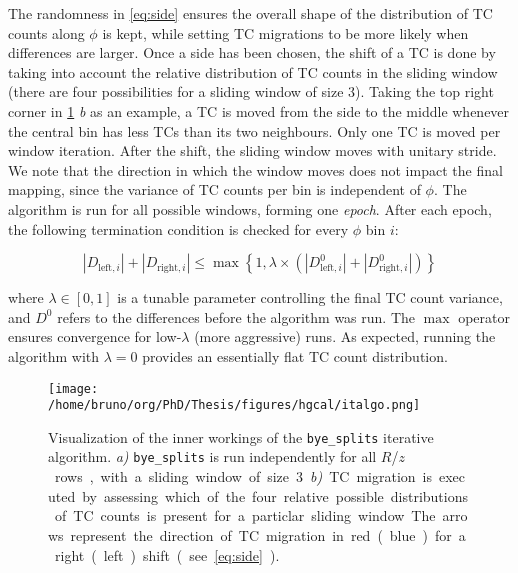\documentclass[11pt]{article}
\newcommand{\azimuth}{$\phi$}
\newcommand{\bsplits}{\texttt{bye\_splits}}
\newcommand{\rz}{$R$/$z$}
\begin{document}
The randomness in \cref{eq:side} ensures the overall shape of the distribution of \ac{TC} counts along \azimuth{} is kept, while setting \ac{TC} migrations to be more likely when differences are larger.
Once a side has been chosen, the shift of a \ac{TC} is done by taking into account the relative distribution of \ac{TC} counts in the sliding window (there are four possibilities for a sliding window of size 3).
Taking the top right corner in \cref{fig:italgo} \emph{b} as an example, a \ac{TC} is moved from the side to the middle whenever the central bin has less \acp{TC} than its two neighbours.
Only one \ac{TC} is moved per window iteration.
After the shift, the sliding window moves with unitary stride.
We note that the direction in which the window moves does not impact the final mapping, since the variance of \ac{TC} counts per bin is independent of \azimuth{}.
The algorithm is run for all possible windows, forming one \emph{epoch}.
After each epoch, the following termination condition is checked for every \azimuth{} bin \(i\):

\begin{equation}
\label{eq:termination}
  \left|D_{\text{left}, i}\right| + \left|D_{\text{right}, i}\right| \leq \max\left\{1, \lambda \times \left(\left|D^{0}_{\text{left}, i}\right| + \left|D^{0}_{\text{right}, i}\right| \right) \right\}
\end{equation}

\noindent where \(\lambda \in \left[0, 1\right]\) is a tunable parameter controlling the final \ac{TC} count variance, and \(D^0\) refers to the differences before the algorithm was run. The \(\max\) operator ensures convergence for low-\(\lambda\) (more aggressive) runs.
As expected, running the algorithm with \(\lambda=0\) provides an essentially flat \ac{TC} count distribution.

\begin{figure}
\texttt{[image: /home/bruno/org/PhD/Thesis/figures/hgcal/italgo.png]}
\caption{\label{fig:italgo}Visualization of the inner workings of the \bsplits{} iterative algorithm. \emph{a)} \bsplits{} is run independently for all \si{\rz} rows, with a sliding window of size 3. \emph{b)} \ac{TC} migration is executed by assessing which of the four relative possible distributions of \ac{TC} counts is present for a particlar sliding window. The arrows represent the direction of \ac{TC} migration in red (blue) for a right (left) shift (see \cref{eq:side}).}
\end{figure}
\end{document}

